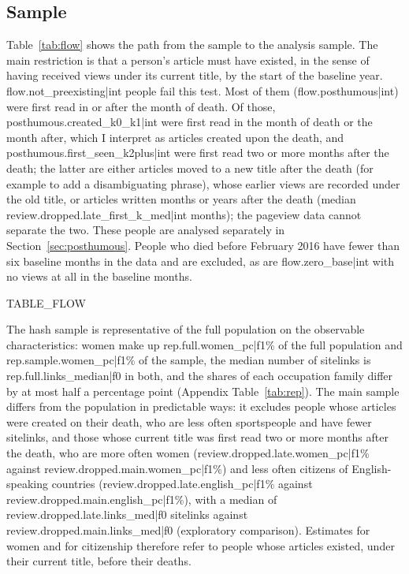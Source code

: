 \documentclass[11pt,a4paper]{article}
\begin{document}
\subsection{Sample}
Table~\ref{tab:flow} shows the path from the sample to the analysis sample. The main restriction is that a person's article must have existed, in the sense of having received views under its current title, by the start of the baseline year. {{flow.not_preexisting|int}} people fail this test. Most of them ({{flow.posthumous|int}}) were first read in or after the month of death. Of those, {{posthumous.created_k0_k1|int}} were first read in the month of death or the month after, which I interpret as articles created upon the death, and {{posthumous.first_seen_k2plus|int}} were first read two or more months after the death; the latter are either articles moved to a new title after the death (for example to add a disambiguating phrase), whose earlier views are recorded under the old title, or articles written months or years after the death (median {{review.dropped.late_first_k_med|int}} months); the pageview data cannot separate the two. These people are analysed separately in Section~\ref{sec:posthumous}. People who died before February 2016 have fewer than six baseline months in the data and are excluded, as are {{flow.zero_base|int}} with no views at all in the baseline months.

{{TABLE_FLOW}}

The hash sample is representative of the full population on the observable characteristics: women make up {{rep.full.women_pc|f1}}\% of the full population and {{rep.sample.women_pc|f1}}\% of the sample, the median number of sitelinks is {{rep.full.links_median|f0}} in both, and the shares of each occupation family differ by at most half a percentage point (Appendix Table~\ref{tab:rep}). The main sample differs from the population in predictable ways: it excludes people whose articles were created on their death, who are less often sportspeople and have fewer sitelinks, and those whose current title was first read two or more months after the death, who are more often women ({{review.dropped.late.women_pc|f1}}\% against {{review.dropped.main.women_pc|f1}}\%) and less often citizens of English-speaking countries ({{review.dropped.late.english_pc|f1}}\% against {{review.dropped.main.english_pc|f1}}\%), with a median of {{review.dropped.late.links_med|f0}} sitelinks against {{review.dropped.main.links_med|f0}} (exploratory comparison). Estimates for women and for citizenship therefore refer to people whose articles existed, under their current title, before their deaths.
\end{document}
